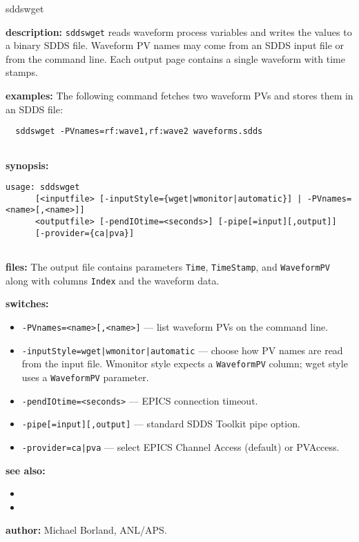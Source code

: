 \begin{sddsprog}{sddswget}
\item \textbf{description:}
  \verb+sddswget+ reads waveform process variables and writes the values to a binary SDDS file.  Waveform PV names may come from an SDDS input file or from the command line.  Each output page contains a single waveform with time stamps.

\item \textbf{examples:}
  The following command fetches two waveform PVs and stores them in an SDDS file:
  \begin{verbatim}
  sddswget -PVnames=rf:wave1,rf:wave2 waveforms.sdds
  
\end{verbatim}

\item \textbf{synopsis:}
  \begin{verbatim}
usage: sddswget
      [<inputfile> [-inputStyle={wget|wmonitor|automatic}] | -PVnames=<name>[,<name>]]
      <outputfile> [-pendIOtime=<seconds>] [-pipe[=input][,output]]
      [-provider={ca|pva}]
  
\end{verbatim}

\item \textbf{files:}
  The output file contains parameters \verb+Time+, \verb+TimeStamp+, and \verb+WaveformPV+ along with columns \verb+Index+ and the waveform data.

\item \textbf{switches:}
\begin{itemize}
  \item {\tt -PVnames=<name>[,<name>]} --- list waveform PVs on the command line.
  \item {\tt -inputStyle={wget|wmonitor|automatic}} --- choose how PV names are read from the input file.  Wmonitor style expects a \verb+WaveformPV+ column; wget style uses a \verb+WaveformPV+ parameter.
  \item {\tt -pendIOtime=<seconds>} --- EPICS connection timeout.
  \item {\tt -pipe[=input][,output]} --- standard SDDS Toolkit pipe option.
  \item {\tt -provider={ca|pva}} --- select EPICS Channel Access (default) or PVAccess.
\end{itemize}

\item \textbf{see also:}
\begin{itemize}
  \item {}
  \item {}
\end{itemize}

\item \textbf{author:} Michael Borland, ANL/APS.
\end{sddsprog}
